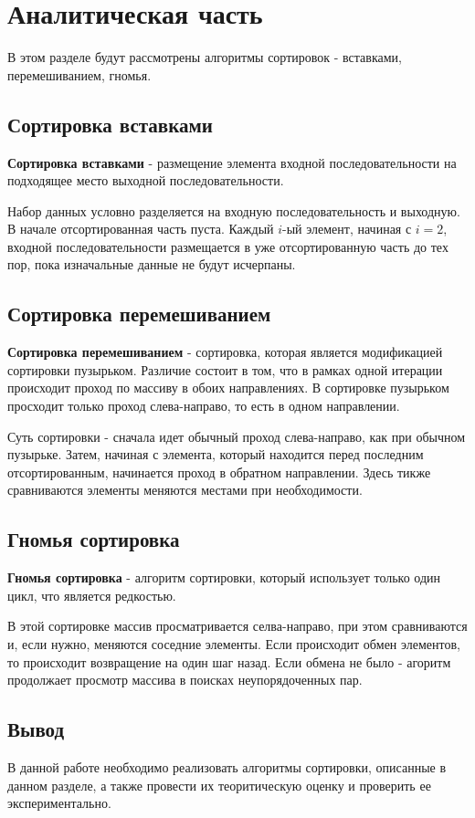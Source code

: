 \chapter{Аналитическая часть}
В этом разделе будут рассмотрены алгоритмы сортировок - вставками, перемешиванием, гномья.

\section{Сортировка вставками}
\textbf{Сортировка вставками} \cite{insertion-sort} - размещение элемента входной последовательности на подходящее место выходной последовательности.

Набор данных условно разделяется на входную последовательность и выходную. В начале отсортированная часть пуста. Каждый $i$-ый элемент, начиная с $i = 2$, входной последовательности размещается в уже отсортированную часть до тех пор, пока изначальные данные не будут исчерпаны.


\section{Сортировка перемешиванием}
\textbf{Сортировка перемешиванием} \cite{sheyker-sort} - сортировка, которая является модификацией сортировки пузырьком. Различие состоит в том, что в рамках одной итерации происходит проход по массиву в обоих направлениях. В сортировке пузырьком просходит только проход слева-направо, то есть в одном направлении.

Суть сортировки - сначала идет обычный проход слева-направо, как при обычном пузырьке. Затем, начиная с элемента, который находится перед последним отсортированным, начинается проход в обратном направлении. Здесь тикже сравниваются элементы меняются местами при необходимости.


\section{Гномья сортировка}
\textbf{Гномья сортировка} \cite{gnomme-sort} - алгоритм сортировки, который использует только один цикл, что является редкостью.

В этой сортировке массив просматривается селва-направо, при этом сравниваются и, если нужно, меняются соседние элементы. Если происходит обмен элементов, то происходит возвращение на один шаг назад. Если обмена не было - агоритм продолжает просмотр массива в поисках неупорядоченных пар.

\section*{Вывод}
В данной работе необходимо реализовать алгоритмы сортировки, описанные в данном разделе, а также провести их теоритическую оценку и проверить ее экспериментально.